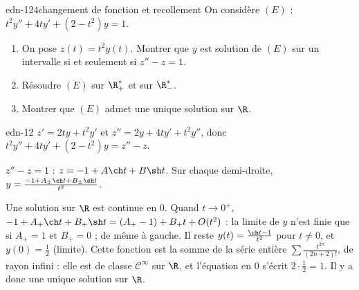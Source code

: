 \begin{exo}{edn-12}{4}{changement de fonction et recollement}
On considère $(E)$ : $t^2y''+4ty'+(2-t^2)y=1$.
\begin{enumerate}
\item On pose $z(t)=t^2y(t)$. Montrer que $y$ est solution de $(E)$ sur un intervalle si et seulement si $z''-z=1$.
\item Résoudre $(E)$ sur $\R_+^*$ et sur $\R_-^*$.
\item Montrer que $(E)$ admet une unique solution sur $\R$.
\end{enumerate}
\end{exo}
\begin{corrige}{edn-12}
 $z'=2ty+t^2y'$ et $z''=2y+4ty'+t^2y''$, donc $t^2y''+4ty'+(2-t^2)y=z''-z$.

 $z''-z=1$ : $z=-1+A\ch t+B\sh t$. Sur chaque demi-droite, $y=\frac{-1+A_\pm\ch t+B_\pm\sh t}{t^2}$.

 Une solution sur $\R$ est continue en $0$. Quand $t\to0^+$, $-1+A_+\ch t+B_+\sh t=(A_+-1)+B_+t+O(t^2)$ : la limite de $y$ n'est
finie que si $A_+=1$ et $B_+=0$ ; de même à gauche. Il reste $y(t)=\frac{\ch t-1}{t^2}$ pour $t\neq0$, et $y(0)=\frac12$ (limite).
Cette fonction est la somme de la série entière $\sum\frac{t^{2n}}{(2n+2)!}$, de rayon infini : elle est de classe
$\mathcal C^\infty$ sur $\R$, et l'équation en $0$ s'écrit $2\cdot\frac12=1$. Il y a donc une unique solution sur $\R$.
\end{corrige}

